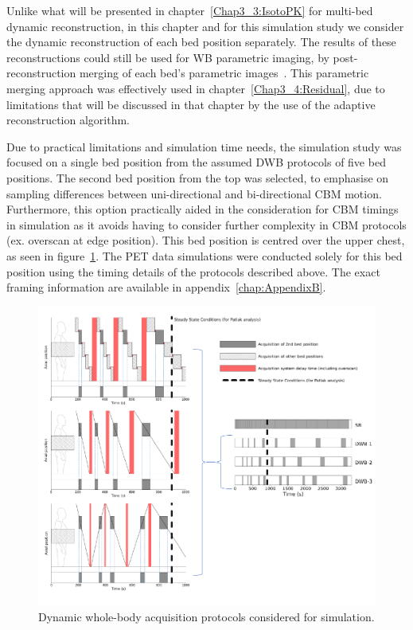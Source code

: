Unlike what will be presented in chapter~\ref{Chap3_3:IsotoPK} for multi-bed dynamic reconstruction, in this chapter and for this simulation study we consider the dynamic reconstruction of each bed position separately. The results of these reconstructions could still be used for WB parametric imaging, by post-reconstruction merging of each bed's parametric images~\cite{Karakatsanis2016a}. This parametric merging approach was effectively used in chapter~\ref{Chap3_4:Residual}, due to limitations that will be discussed in that chapter by the use of the adaptive reconstruction algorithm.

Due to practical limitations and simulation time needs, the simulation study was focused on a single bed position from the assumed DWB protocols of five bed positions.
The second bed position from the top was selected, to emphasise on sampling differences between uni-directional and bi-directional CBM motion. Furthermore, this option practically aided in the consideration for CBM timings in simulation as it avoids having to consider further complexity in CBM protocols (ex. overscan at edge position).
This bed position is centred over the upper chest, as seen in figure~\ref{fig:DWBprotocols}.
The PET data simulations were conducted solely for this bed position using the timing details of the protocols described above. The exact framing information are available in appendix~\ref{chap:AppendixB}.%


\begin{figure} [ht!]
\centering
\includegraphics[scale=1.03,angle=0]{3_Results/3_2_Dynamic_Reconstruction_SimulationStudy/figures/protocols.pdf}
\caption{Dynamic whole-body acquisition protocols considered for simulation.} 
\label{fig:DWBprotocols}
\end{figure}

